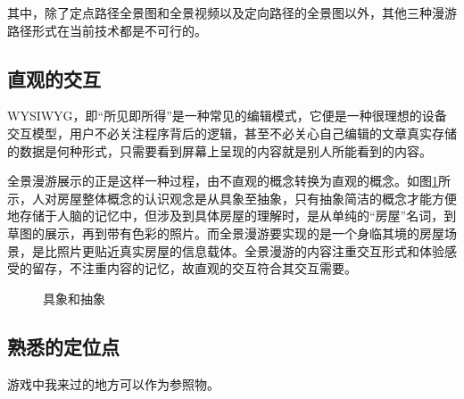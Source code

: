 其中，除了定点路径全景图和全景视频以及定向路径的全景图以外，其他三种漫游路径形式在当前技术都是不可行的。

\subsection{直观的交互}
WYSIWYG，即“所见即所得”是一种常见的编辑模式，它便是一种很理想的设备交互模型，用户不必关注程序背后的逻辑，甚至不必关心自己编辑的文章真实存储的数据是何种形式，只需要看到屏幕上呈现的内容就是别人所能看到的内容。

全景漫游展示的正是这样一种过程，由不直观的概念转换为直观的概念。如图\ref{fig:wysiwyg}所示，人对房屋整体概念的认识观念是从具象至抽象，只有抽象简洁的概念才能方便地存储于人脑的记忆中，但涉及到具体房屋的理解时，是从单纯的“房屋”名词，到草图的展示，再到带有色彩的照片。而全景漫游要实现的是一个身临其境的房屋场景，是比照片更贴近真实房屋的信息载体。全景漫游的内容注重交互形式和体验感受的留存，不注重内容的记忆，故直观的交互符合其交互需要。

\begin{figure}[htp]
\centering
{}
\caption{具象和抽象}
\label{fig:wysiwyg}
\end{figure}

\subsection{熟悉的定位点}
游戏中我来过的地方可以作为参照物。
